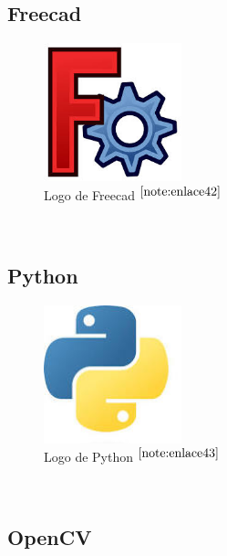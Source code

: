 \subsection{Freecad}

\begin{figure} [h!]
	\begin{center}
		\includegraphics[width=4cm]{figs/freecad.png}
	\end{center}
	\caption{Logo de Freecad $^{\ref{note:enlace42}}$} 
	\label{fig:freecad}
\end{figure}\

\setcounter{footnote}{42} %

\subsection{Python}

\begin{figure} [h!]
	\begin{center}
		\includegraphics[width=4cm]{figs/python.png}
	\end{center}
	\caption{Logo de Python $^{\ref{note:enlace43}}$} 
	\label{fig:python}
\end{figure}\

\setcounter{footnote}{43} %

\subsection{OpenCV}

